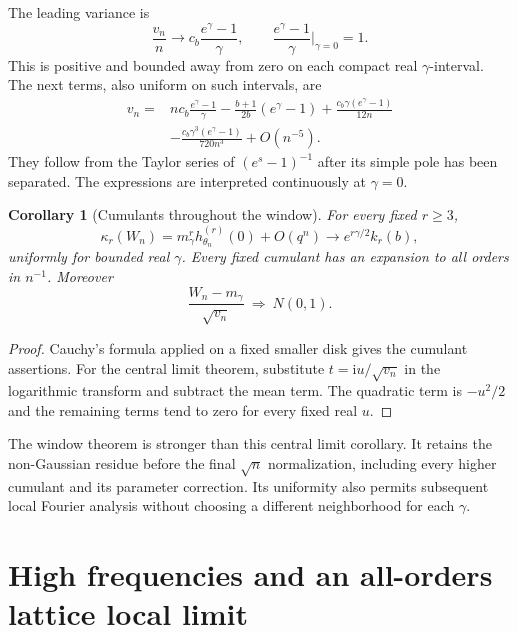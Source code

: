 \documentclass[11pt]{article}
\newtheorem{corollary}[theorem]{Corollary}
\theoremstyle{definition}
\newcommand{\ii}{\mathrm i}
\begin{document}
The leading variance is
\begin{equation}\label{eq:variance-leading}
 \frac{v_n}{n}\longrightarrow
        c_b\frac{e^\gamma-1}{\gamma},
 \qquad \frac{e^\gamma-1}{\gamma}\Big|_{\gamma=0}=1.
\end{equation}
This is positive and bounded away from zero on each compact real
$\gamma$-interval. The next terms, also uniform on such intervals, are
\begin{equation}\label{eq:variance-series}
 \begin{split}
 v_n={}&nc_b\frac{e^\gamma-1}{\gamma}
 -\frac{b+1}{2b}(e^\gamma-1)
 +\frac{c_b\gamma(e^\gamma-1)}{12n}\\
 &-\frac{c_b\gamma^3(e^\gamma-1)}{720n^3}+O(n^{-5}).
 \end{split}
\end{equation}
They follow from the Taylor series of $(e^s-1)^{-1}$ after its simple
pole has been separated. The expressions are interpreted continuously
at $\gamma=0$.

\begin{corollary}[Cumulants throughout the window]\label{cor:window-cumulants}
For every fixed $r\geq3$,
\[
 \kappa_r(W_n)=m_\gamma^r h_{\theta_n}^{(r)}(0)+O(q^n)
       \longrightarrow e^{r\gamma/2}k_r(b),
\]
uniformly for bounded real $\gamma$. Every fixed cumulant has an
expansion to all orders in $n^{-1}$. Moreover
\[
                   \frac{W_n-m_\gamma}{\sqrt{v_n}}
                       \ \Longrightarrow\ N(0,1).
\]
\end{corollary}

\begin{proof}
Cauchy's formula applied on a fixed smaller disk gives the cumulant
assertions. For the central limit theorem, substitute
$t=\ii u/\sqrt{v_n}$ in the logarithmic transform and subtract the
mean term. The quadratic term is $-u^2/2$ and the remaining terms tend
to zero for every fixed real $u$.
\end{proof}

The window theorem is stronger than this central limit corollary.
It retains the non-Gaussian residue before the final $\sqrt n$
normalization, including every higher cumulant and its parameter
correction. Its uniformity also permits subsequent local Fourier
analysis without choosing a different neighborhood for each $\gamma$.

\section{High frequencies and an all-orders lattice local limit}
\end{document}

